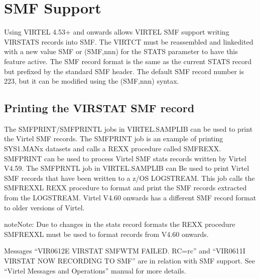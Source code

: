 \documentclass[letterpaper,10pt,english]{sphinxmanual}
\begin{document}
\newpage

\ignorespaces 

\section{SMF Support}
\label{\detokenize{audit_operations_ and_performance:smf-support}}\label{\detokenize{audit_operations_ and_performance:index-91}}
\sphinxAtStartPar
Using VIRTEL 4.53+ and onwards allows VIRTEL SMF support writing VIRSTATS records into SMF. The VIRTCT must be reassembled and link\sphinxhyphen{}edited with a new value SMF or (SMF,nnn) for the STATS parameter to have this feature active. The SMF record format is the same as the current STATS record but prefixed by the standard SMF header. The default SMF record number is 223, but it can be modified using the (SMF,nnn) syntax.

\ignorespaces 

\subsection{Printing the VIRSTAT SMF record}
\label{\detokenize{audit_operations_ and_performance:printing-the-virstat-smf-record}}\label{\detokenize{audit_operations_ and_performance:index-92}}
\sphinxAtStartPar
The SMFPRINT/SMFPRINTL jobs in VIRTEL.SAMPLIB can be used to print the Virtel SMF records. The SMFPRINT job is an example of printing SYS1.MANx datasets and calls a REXX procedure called SMFREXX. SMFPRINT can be used to process Virtel SMF stats records written by Virtel V4.59. The SMFPRNTL job in VIRTEL.SAMPLIB can Be used to print Virtel SMF records that have been written to a z/OS LOGSTREAM. This job calls the SMFREXXL REXX procedure to format and print the SMF records extracted from the LOGSTREAM. Virtel V4.60 onwards has a different SMF record format to older versions of Virtel.

\begin{sphinxadmonition}{note}{Note:}
\sphinxAtStartPar
Due to changes in the stats record formats the REXX procedure SMFREXXL must be used to format records from V4.60 onwards.
\end{sphinxadmonition}

\sphinxAtStartPar
Messages “VIR0612E VIRSTAT SMFWTM FAILED. RC=rc” and “VIR0611I VIRSTAT NOW RECORDING TO SMF” are in relation with SMF support. See “Virtel Messages and Operations” manual for more details.
\end{document}
